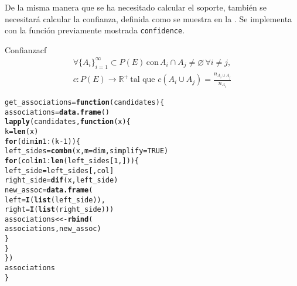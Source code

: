 \documentclass[12pt]{report}\usepackage[]{graphicx}\usepackage[dvipsnames]{xcolor}
\makeatletter
\newcommand{\hlnum}[1]{\textcolor[rgb]{0.686,0.059,0.569}{#1}}%
\newcommand{\hlopt}[1]{\textcolor[rgb]{0,0,0}{#1}}%
\newcommand{\hlstd}[1]{\textcolor[rgb]{0.345,0.345,0.345}{#1}}%
\newcommand{\hlkwa}[1]{\textcolor[rgb]{0.161,0.373,0.58}{\textbf{#1}}}%
\newcommand{\hlkwb}[1]{\textcolor[rgb]{0.69,0.353,0.396}{#1}}%
\newcommand{\hlkwc}[1]{\textcolor[rgb]{0.333,0.667,0.333}{#1}}%
\newcommand{\hlkwd}[1]{\textcolor[rgb]{0.737,0.353,0.396}{\textbf{#1}}}%
\newenvironment{kframe}{%
 \def\at@end@of@kframe{}%
 \ifinner\ifhmode%
  \def\at@end@of@kframe{\end{minipage}}%
  \begin{minipage}{\columnwidth}%
 \fi\fi%
 \def\FrameCommand##1{\hskip\@totalleftmargin \hskip-\fboxsep
 \colorbox{shadecolor}{##1}\hskip-\fboxsep
     \hskip-\linewidth \hskip-\@totalleftmargin \hskip\columnwidth}%
 \MakeFramed {\advance\hsize-\width
   \@totalleftmargin\z@ \linewidth\hsize
   \@setminipage}}%
 {\par\unskip\endMakeFramed%
 \at@end@of@kframe}
\newenvironment{knitrout}{}{} %
\makeatother
\begin{document}
			De la misma manera que se ha necesitado calcular el soporte, también se necesitará calcular la confianza, definida como se muestra en la . Se implementa con la función previamente mostrada \texttt{confidence}. 
			
			\begin{definicion}{Confianza}{cf}
				\begin{equation*}
					\begin{gathered}
						\forall\{A_i\}_{i=1}^\infty \subset P(E) \, \text{con} \, A_i \cap A_j \neq \varnothing \, \forall i \neq j, \\
						c: P(E) \longrightarrow \mathbb{R}^+ \, \text{tal que} \,\, c(A_i \cup A_j) = \frac{n_{A_i \cup A_j}}{n_{A_i}}
					\end{gathered}
				\end{equation*}
			\end{definicion}
			
\begin{knitrout}
\color{fgcolor}\begin{kframe}
\begin{alltt}
\hlstd{get_associations} \hlkwb{=} \hlkwa{function}\hlstd{(}\hlkwc{candidates}\hlstd{) \{}
        \hlstd{associations} \hlkwb{=} \hlkwd{data.frame}\hlstd{()}
        \hlkwd{lapply}\hlstd{(candidates,} \hlkwa{function}\hlstd{(}\hlkwc{x}\hlstd{) \{}
                \hlstd{k} \hlkwb{=} \hlkwd{len}\hlstd{(x)}
                \hlkwa{for} \hlstd{(dim} \hlkwa{in} \hlnum{1}\hlopt{:}\hlstd{(k} \hlopt{-} \hlnum{1}\hlstd{)) \{}
                        \hlstd{left_sides} \hlkwb{=} \hlkwd{combn}\hlstd{(x,} \hlkwc{m}\hlstd{=dim,} \hlkwc{simplify}\hlstd{=}\hlnum{TRUE}\hlstd{)}
                        \hlkwa{for} \hlstd{(col} \hlkwa{in} \hlnum{1}\hlopt{:}\hlkwd{len}\hlstd{(left_sides[}\hlnum{1}\hlstd{,])) \{}
                                \hlstd{left_side} \hlkwb{=} \hlstd{left_sides[, col]}
                                \hlstd{right_side} \hlkwb{=} \hlkwd{dif}\hlstd{(x, left_side)}
                                \hlstd{new_assoc} \hlkwb{=} \hlkwd{data.frame}\hlstd{(}
                                        \hlkwc{left} \hlstd{=} \hlkwd{I}\hlstd{(}\hlkwd{list}\hlstd{(left_side)),}
                                        \hlkwc{right} \hlstd{=} \hlkwd{I}\hlstd{(}\hlkwd{list}\hlstd{(right_side)))}
                                \hlstd{associations} \hlkwb{<<-} \hlkwd{rbind}\hlstd{(}
                                        \hlstd{associations, new_assoc)}
                        \hlstd{\}}
                \hlstd{\}}
        \hlstd{\})}
        \hlstd{associations}
\hlstd{\}}
\end{alltt}
\end{kframe}
\end{knitrout}
			
\end{document}
